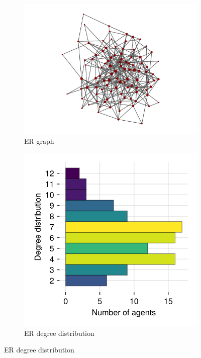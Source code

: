 \documentclass[]{article}
\begin{document}
\begin{figure}
	\begin{subfigure}{0.45\textwidth}
		\centering
		\includegraphics[width=0.9\linewidth]{../plots/g_erdosrenyi_n100_p3_s33} 
		\caption{ER graph}  \label{fig:subim11}
	\end{subfigure}
	\hfill
	\begin{subfigure}{0.45\textwidth}
		\centering
		\includegraphics[width=0.7\linewidth]{../plots/g_erdosrenyi_hist_degree_n100_p3_s33}
		\caption{ER degree distribution} \label{fig:subim12}
	\end{subfigure}
	

\end{figure}
\end{document}
